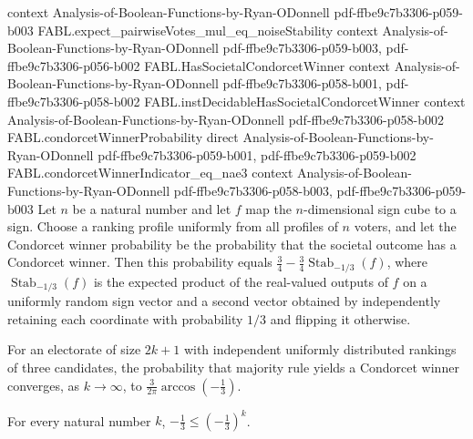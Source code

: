 \begin{theorem}
  {context}
  {Analysis-of-Boolean-Functions-by-Ryan-ODonnell}
  {pdf-ffbe9c7b3306-p059-b003}
\proofstep
  {FABL.expect_pairwiseVotes_mul_eq_noiseStability}
  {context}
  {Analysis-of-Boolean-Functions-by-Ryan-ODonnell}
  {pdf-ffbe9c7b3306-p059-b003,
    pdf-ffbe9c7b3306-p056-b002}
\proofstep
  {FABL.HasSocietalCondorcetWinner}
  {context}
  {Analysis-of-Boolean-Functions-by-Ryan-ODonnell}
  {pdf-ffbe9c7b3306-p058-b001,
    pdf-ffbe9c7b3306-p058-b002}
\proofstep
  {FABL.instDecidableHasSocietalCondorcetWinner}
  {context}
  {Analysis-of-Boolean-Functions-by-Ryan-ODonnell}
  {pdf-ffbe9c7b3306-p058-b002}
\proofstep
  {FABL.condorcetWinnerProbability}
  {direct}
  {Analysis-of-Boolean-Functions-by-Ryan-ODonnell}
  {pdf-ffbe9c7b3306-p059-b001,
    pdf-ffbe9c7b3306-p059-b002}
\proofstep
  {FABL.condorcetWinnerIndicator_eq_nae3}
  {context}
  {Analysis-of-Boolean-Functions-by-Ryan-ODonnell}
  {pdf-ffbe9c7b3306-p058-b003,
    pdf-ffbe9c7b3306-p059-b003}
Let $n$ be a natural number and let $f$ map the $n$-dimensional sign cube to a sign.
Choose a ranking profile uniformly from all profiles of $n$ voters, and let the
Condorcet winner probability be the probability that the societal outcome has a
Condorcet winner. Then this probability equals
$\frac34-\frac34\operatorname{Stab}_{-1/3}(f)$, where $\operatorname{Stab}_{-1/3}(f)$ is
the expected product of the real-valued outputs of $f$ on a uniformly random sign vector
and a second vector obtained by independently retaining each coordinate with probability
$1/3$ and flipping it otherwise.
\end{theorem}

\begin{theorem}
\label{FABL.tendsto_condorcetWinnerProbability_majority_odd}
\leanok
{}
For an electorate of size $2k+1$ with independent uniformly distributed rankings of
three candidates, the probability that majority rule yields a Condorcet winner
converges, as $k\to\infty$, to $\frac{3}{2\pi}\arccos(-\frac13)$.
\end{theorem}

\begin{theorem}
\label{FABL.neg_one_third_le_pow}
\leanok
{}
For every natural number $k$, $-\frac13\le\left(-\frac13\right)^k$.
\end{theorem}

